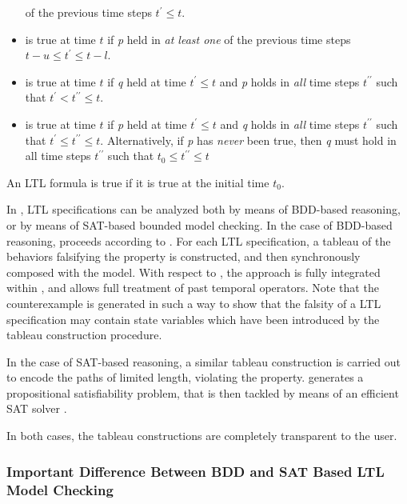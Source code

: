 \begin{itemize}
        of the previous time steps $t^\prime \leq t$.
  \item {} is true at time $t$ if
        \textit{p} held in \emph{at least one} of the previous time
        steps $t-u \leq t^\prime \leq t-l$.
  \item {} is true at time $t$ if \textit{q} held at time
        $t^\prime \leq t$ and \textit{p} holds in \emph{all} time steps $t^{\prime\prime}$ such
        that $t^\prime < t^{\prime\prime} \le t$.
  \item {} is true at time $t$ if \textit{p} held at time
        $t^\prime \leq t$ and \textit{q} holds in \emph{all} time steps $t^{\prime\prime}$ such
        that $t^\prime \le t^{\prime\prime} \le t$. Alternatively, if \textit{p} has \emph{never}
        been true, then \textit{q} must hold in all time steps $t^{\prime\prime}$ such
        that $t_0 \le t^{\prime\prime} \le t$
\end{itemize}
An LTL formula is true if it is true at the initial time $t_0$.

In \nusmv, LTL specifications can be analyzed both by means of
BDD-based reasoning, or by means of SAT-based bounded model
checking. 
%
In the case of BDD-based reasoning, \nusmv proceeds according to
\cite{CGH97}. 
%
For each LTL specification, a tableau of the behaviors falsifying the
property is constructed, and then synchronously composed with the
model. 
%
With respect to \cite{CGH97}, the approach is fully integrated within
\nusmv, and allows full treatment of past temporal operators. 
%
Note that the counterexample is generated in such a way to show that the falsity
of a LTL specification may contain state variables which have been
introduced by the tableau construction procedure.

In the case of SAT-based reasoning, a similar tableau construction is
carried out to encode the paths of limited length, violating the
property.
%
\nusmv generates a propositional satisfiability problem, that is then
tackled by means of an efficient SAT solver \cite{BCCZ99}.

In both cases, the tableau constructions are completely transparent to
the user.

\subsubsection{Important Difference Between BDD and SAT Based LTL Model Checking}
\label{Important Difference Between BDD and SAT Based LTL Model Checking}

